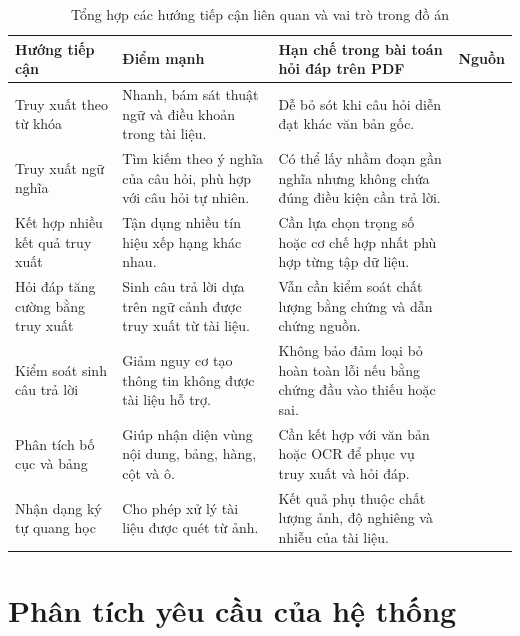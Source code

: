 \documentclass[../DoAn.tex]{subfiles}
\begin{document}
\begin{table}[H]
\centering
\small
\renewcommand{\arraystretch}{1.2}
\caption{Tổng hợp các hướng tiếp cận liên quan và vai trò trong đồ án}
\label{tab:related-work-summary}
\begin{tabularx}{\textwidth}{
    |>{\raggedright\arraybackslash}p{}
    |>{\raggedright\arraybackslash}p{}
    |>{\raggedright\arraybackslash}X
    |>{\raggedright\arraybackslash}p{}|
}
\hline
\textbf{Hướng tiếp cận} & \textbf{Điểm mạnh} & \textbf{Hạn chế trong bài toán hỏi đáp trên PDF} & \textbf{Nguồn} \\
\hline
Truy xuất theo từ khóa &
Nhanh, bám sát thuật ngữ và điều khoản trong tài liệu. &
Dễ bỏ sót khi câu hỏi diễn đạt khác văn bản gốc. &
\cite{robertson2009bm25} \\
\hline
Truy xuất ngữ nghĩa &
Tìm kiếm theo ý nghĩa của câu hỏi, phù hợp với câu hỏi tự nhiên. &
Có thể lấy nhầm đoạn gần nghĩa nhưng không chứa đúng điều kiện cần trả lời. &
\cite{karpukhin2020dpr,reimers2019sentencebert} \\
\hline
Kết hợp nhiều kết quả truy xuất &
Tận dụng nhiều tín hiệu xếp hạng khác nhau. &
Cần lựa chọn trọng số hoặc cơ chế hợp nhất phù hợp từng tập dữ liệu. &
\cite{cormack2009rrf} \\
\hline
Hỏi đáp tăng cường bằng truy xuất &
Sinh câu trả lời dựa trên ngữ cảnh được truy xuất từ tài liệu. &
Vẫn cần kiểm soát chất lượng bằng chứng và dẫn chứng nguồn. &
\cite{lewis2020rag} \\
\hline
Kiểm soát sinh câu trả lời &
Giảm nguy cơ tạo thông tin không được tài liệu hỗ trợ. &
Không bảo đảm loại bỏ hoàn toàn lỗi nếu bằng chứng đầu vào thiếu hoặc sai. &
\cite{asai2024selfrag,jeong2024adaptiverag} \\
\hline
Phân tích bố cục và bảng &
Giúp nhận diện vùng nội dung, bảng, hàng, cột và ô. &
Cần kết hợp với văn bản hoặc OCR để phục vụ truy xuất và hỏi đáp. &
\cite{pfitzmann2022doclaynet,smock2022pubtables} \\
\hline
Nhận dạng ký tự quang học &
Cho phép xử lý tài liệu được quét từ ảnh. &
Kết quả phụ thuộc chất lượng ảnh, độ nghiêng và nhiễu của tài liệu. &
\cite{du2020ppocr} \\
\hline
\end{tabularx}
\end{table}

\section{Phân tích yêu cầu của hệ thống}
\label{section:system-requirements}
\end{document}
